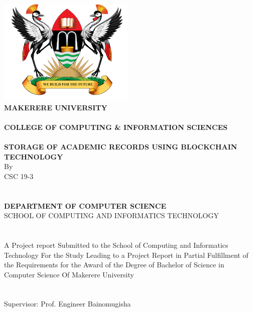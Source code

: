 \begin{titlepage}
\begin{center}

		\includegraphics{images/muklogo2.png} \\
		
\large\textbf{MAKERERE UNIVERSITY}\\~\\

\textbf{COLLEGE OF COMPUTING \& INFORMATION SCIENCES}\\~\\
\textbf{STORAGE OF ACADEMIC RECORDS USING BLOCKCHAIN TECHNOLOGY}\\
By \\ 
CSC 19-3\\~\\~\\
\textbf{DEPARTMENT OF COMPUTER SCIENCE}\\
\normalsize{SCHOOL OF COMPUTING AND INFORMATICS TECHNOLOGY}\\~\\~\\
A Project report Submitted to the School of Computing and Informatics Technology
For the Study Leading to a Project Report in Partial Fulfillment of the
Requirements for the Award of the Degree of Bachelor of Science in Computer Science 
Of Makerere University\\~\\~\\
Supervisor: Prof. Engineer Bainomugisha\\~\\


\end{center}
\end{titlepage}
